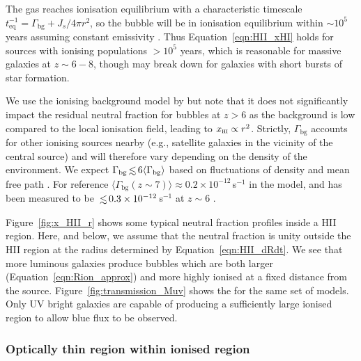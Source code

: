 \documentclass[fleqn,usenatbib]{mnras}
\begin{document}
The gas reaches ionisation equilibrium with a characteristic timescale $t_\mathrm{eq}^{-1} = \Gamma_\mathrm{bg} + J_s/4\pi r^2$, so the bubble will be in ionisation equilibrium within $\sim10^5$ years assuming constant emissivity \citep[e.g.,][]{Davies2019}. Thus Equation~\eqref{eqn:HII_xHI} holds for sources with ionising populations $>10^5$ years, which is reasonable for massive galaxies at $z\sim6-8$, though may break down for galaxies with short bursts of star formation.

We use the ionising background model by \citet{Khaire2019} but note that it does not significantly impact the residual neutral fraction for bubbles at $z>6$ as the background is low compared to the local ionisation field, leading to $\xHI\propto r^2$. Strictly, $\Gamma_\textrm{bg}$ accounts for other ionising sources nearby (e.g., satellite galaxies in the vicinity of the central source) and will therefore vary depending on the density of the environment. We expect $\Gamma_\textrm{bg} \simlt 6 \langle \Gamma_\textrm{bg} \rangle$ based on fluctuations of density and mean free path \citep{MesingerDijkstra2008,Davies2016}. For reference $\langle \Gamma_\textrm{bg}(z\sim7) \rangle \approx 0.2\times10^{-12}$\,s$^{-1}$ in the \citet{Khaire2019} model, and has been measured to be $\simlt 0.3\times10^{-12}$\,s$^{-1}$ at $z\sim6$ \citep{Wyithe2010,Calverley2011}.

Figure~\ref{fig:x_HII_r} shows some typical neutral fraction profiles inside a HII region. Here, and below, we assume that the neutral fraction is unity outside the HII region at the radius determined by Equation~\ref{eqn:HII_dRdt}. We see that more luminous galaxies produce bubbles which are both larger (Equation~\ref{eqn:Rion_approx}) and more highly ionised at a fixed distance from the source. Figure~\ref{fig:transmission_Muv} shows the \lya for the same set of models. Only UV bright galaxies are capable of producing a sufficiently large ionised region to allow blue flux to be observed.

\subsubsection{Optically thin region within ionised region}
\label{sec:model_thinregion}
\end{document}
